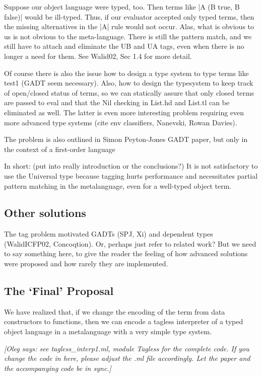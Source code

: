 \documentclass[preprint]{sigplanconf}
\newcommand{\oleg}[1]{{\it [Oleg says: #1]}}
\begin{document}
Suppose our object language were typed, too. Then terms like
|A (B true, B false)| would be ill-typed. Thus, if our evaluator
accepted only typed terms, then the missing alternatives in the |A|
rule would not occur. Alas, what is obvious to us is not obvious to
the meta-language. There is still the pattern match, and we still have
to attach and eliminate the UB and UA tags, even when there is no
longer a need for them. See Walid02, Sec 1.4 for more detail.

Of course there is also the issue how to design a type system to type
terms like test1 (GADT seem necessary). Also, how to design the
typesystem to keep track of open/closed status of terms, so we can
statically assure that only closed terms are passed to eval and that
the Nil checking in List.hd and List.tl can be eliminated as well. The
latter is even more interesting problem requiring even more advanced
type systems (cite env classifiers, Nanevski, Rowan Davies).

The problem is also outlined in Simon Peyton-Jones GADT paper, but
only in the context of a first-order language

In short: (put into really introduction or the conclusions?)
It is not satisfactory
to use the Universal type because tagging hurts performance and
necessitates partial pattern matching in the metalanguage, even for a
well-typed object term.  


\subsection{Other solutions}
The tag problem motivated GADTs (SPJ, Xi) and dependent types
(WalidICFP02, Concoqtion). Or, perhaps just refer to related work?
But we need to say something here, to give the reader the feeling of
how advanced solutions were proposed and how rarely they are implemented.


\subsection{The `Final' Proposal}
We have realized that, if we change the encoding of the term from data
constructors to functions, then we can encode a tagless interpreter of a
typed object language in a metalanguage with a very simple type system.

\oleg{see tagless\_interp1.ml, module Tagless for the complete code.
If you change the code in here, please adjust the .ml file
accordingly. Let the paper and the accompanying code be in sync.}
\end{document}
